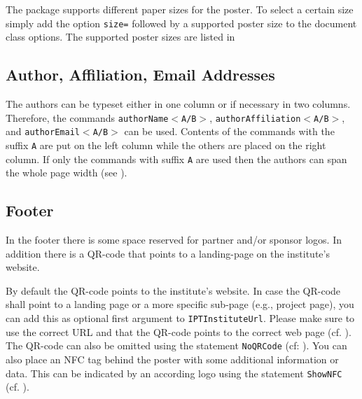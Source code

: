 The \tugPoster{} package supports different paper sizes for the poster. To select a certain size simply add the option \texttt{size=} followed by a supported poster size to the document class options. The supported poster sizes are listed in 



\subsection{Author, Affiliation, Email Addresses}

The authors can be typeset either in one column or if necessary in two columns. Therefore, the commands \texttt{\bs{}authorName$<$A/B$>$}, \texttt{\bs{}authorAffiliation$<$A/B$>$}, and \texttt{\bs{}authorEmail$<$A/B$>$} can be used. Contents of the commands with the suffix \texttt{A} are put on the left column while the others are placed on the right column. If only the commands with suffix \texttt{A} are used then the authors can span the whole page width (see ).




\subsection{Footer} %
\label{subsed:footer}

In the footer there is some space reserved for partner and/or sponsor logos. In addition there is a QR-code that points to a landing-page on the institute's website.

By default the QR-code points to the institute's website. In case the QR-code shall point to a landing page or a more specific sub-page (e.g., project page), you can add this as optional first argument to \texttt{\bs{}IPTInstituteUrl}.  Please make sure to use the correct URL and that the QR-code points to the correct web page (cf. ).
The QR-code can also be omitted using the statement \texttt{\bs{}NoQRCode} (cf: ). You can also place an NFC tag behind the poster with some additional information or data. This can be indicated by an according logo using the statement \texttt{\bs{}ShowNFC} (cf. ).


